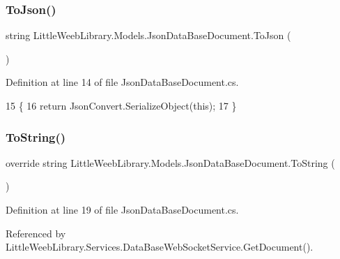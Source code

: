 \subsubsection{\texorpdfstring{To\+Json()}{ToJson()}}
{\footnotesize\ttfamily string Little\+Weeb\+Library.\+Models.\+Json\+Data\+Base\+Document.\+To\+Json (\begin{DoxyParamCaption}{ }\end{DoxyParamCaption})}



Definition at line 14 of file Json\+Data\+Base\+Document.\+cs.


\begin{DoxyCode}
15         \{
16             \textcolor{keywordflow}{return} JsonConvert.SerializeObject(\textcolor{keyword}{this});
17         \}
\end{DoxyCode}
\mbox{\label{class_little_weeb_library_1_1_models_1_1_json_data_base_document_a0a84a997c39ac76d99382cdabf9227bf}} 
\subsubsection{\texorpdfstring{To\+String()}{ToString()}}
{\footnotesize\ttfamily override string Little\+Weeb\+Library.\+Models.\+Json\+Data\+Base\+Document.\+To\+String (\begin{DoxyParamCaption}{ }\end{DoxyParamCaption})}



Definition at line 19 of file Json\+Data\+Base\+Document.\+cs.



Referenced by Little\+Weeb\+Library.\+Services.\+Data\+Base\+Web\+Socket\+Service.\+Get\+Document().


